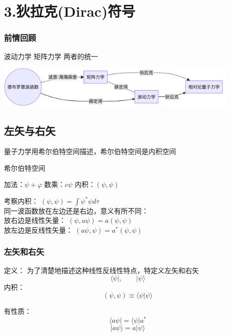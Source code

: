 
\section{3.狄拉克(Dirac)符号}

\begin{frame}
    \frametitle{前情回顾}
    \begin{itemize}
       \done 波动力学
       \done 矩阵力学
       \todo 两者的统一 
    \end{itemize}
        \begin{center}
            \includegraphics[width=0.9\textwidth]{figs/2021-12-06-16-22-39.png}\\   
        \end{center}    
\end{frame} 

\subsection{左矢与右矢}

\begin{frame}
    量子力学用希尔伯特空间描述，希尔伯特空间是内积空间
    \begin{tcolorbox1}{希尔伯特空间}
    \begin{itemize}
        \Item 加法：$\psi + \varphi$
        \Item 数乘：$c\psi$
        \Item 内积：$(\psi,\psi)$
    \end{itemize}
    \end{tcolorbox1}
    考察内积： $(\psi,\psi)=\int\psi^*\psi d\tau$ \\
    同一波函数放在左边还是右边，意义有所不同： \\
    放右边是线性矢量：  $(\psi,a\psi)=a (\psi,\psi)$ \\
    放左边是反线性矢量：   $(a\psi,\psi)=a^* (\psi,\psi)$   
\end{frame}

\begin{frame}
    \frametitle{左矢和右矢}
    \begin{tcolorbox1}{定义：}
    为了清楚地描述这种线性反线性特点，特定义左矢和右矢
    $$\langle \psi |, \qquad |\psi \rangle $$ 
    内积：\[(\psi,\psi)\equiv \langle \psi | \psi \rangle\]

    有性质： $$\langle a\psi | = \langle \psi |a^* $$
    $$ |a\psi \rangle = a|\psi \rangle$$ 
    \end{tcolorbox1}
\end{frame} 

